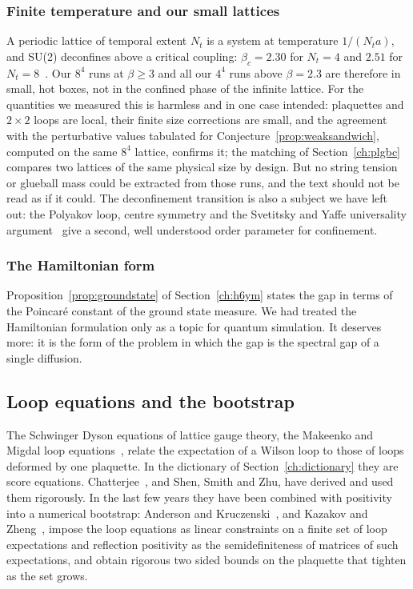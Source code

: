 \subsubsection*{Finite temperature and our small lattices}
A periodic lattice of temporal extent $N_t$ is a system at temperature $1/(N_ta)$, and SU(2) deconfines above a critical coupling: $\beta_c=2.30$ for $N_t=4$ and $2.51$ for $N_t=8$~\cite{FHK}. Our $8^4$ runs at $\beta\ge3$ and all our $4^4$ runs above $\beta=2.3$ are therefore in small, hot boxes, not in the confined phase of the infinite lattice. For the quantities we measured this is harmless and in one case intended: plaquettes and $2\times2$ loops are local, their finite size corrections are small, and the agreement with the perturbative values tabulated for Conjecture~\ref{prop:weaksandwich}, computed on the same $8^4$ lattice, confirms it; the matching of Section~\ref{ch:plgbc} compares two lattices of the same physical size by design. But no string tension or glueball mass could be extracted from those runs, and the text should not be read as if it could. The deconfinement transition is also a subject we have left out: the Polyakov loop, centre symmetry and the Svetitsky and Yaffe universality argument~\cite{SY82} give a second, well understood order parameter for confinement.

\subsubsection*{The Hamiltonian form}
Proposition~\ref{prop:groundstate} of Section~\ref{ch:h6ym} states the gap in terms of the Poincar\'e constant of the ground state measure. We had treated the Hamiltonian formulation only as a topic for quantum simulation. It deserves more: it is the form of the problem in which the gap is the spectral gap of a single diffusion.

\subsection{Loop equations and the bootstrap}

The Schwinger Dyson equations of lattice gauge theory, the Makeenko and Migdal loop equations~\cite{MM79}, relate the expectation of a Wilson loop to those of loops deformed by one plaquette. In the dictionary of Section~\ref{ch:dictionary} they are score equations. Chatterjee~\cite{Ch19so}, and Shen, Smith and Zhu, have derived and used them rigorously. In the last few years they have been combined with positivity into a numerical bootstrap: Anderson and Kruczenski~\cite{AK17}, and Kazakov and Zheng~\cite{KZ23}, impose the loop equations as linear constraints on a finite set of loop expectations and reflection positivity as the semidefiniteness of matrices of such expectations, and obtain rigorous two sided bounds on the plaquette that tighten as the set grows.

